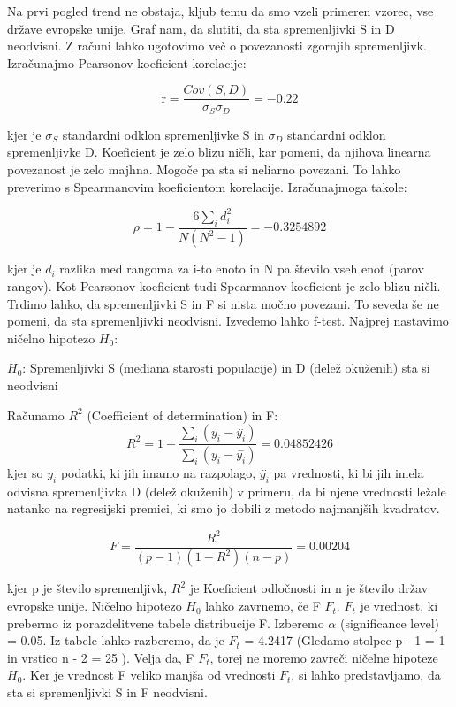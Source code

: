 \documentclass[a4paper,11pt]{article}
\begin{document}
Na prvi pogled trend ne obstaja, kljub temu da smo vzeli primeren vzorec, vse države evropske unije. Graf nam, da slutiti, da sta spremenljivki S in D neodvisni. Z računi lahko ugotovimo več o povezanosti zgornjih spremenljivk. Izračunajmo Pearsonov koeficient korelacije:

\begin{center}
\[\text{r} = \frac{Cov(S,D)}{\sigma_{S} \sigma_{D}} = -0.22\]
\end{center} 

kjer je \(\sigma_{S}\) standardni odklon spremenljivke S in \(\sigma_{D}\) standardni odklon spremenljivke D. Koeficient je zelo blizu ničli, kar pomeni, da njihova linearna povezanost je zelo majhna. Mogoče pa sta si neliarno povezani. To lahko preverimo s Spearmanovim koeficientom korelacije. Izračunajmoga takole: 

\begin{center}
\[\rho = 1 - \frac{6\sum_{i}{}d_i^2}{N(N^2 - 1)} = -0.3254892\]
\end{center} 

kjer je \( d_i \) razlika med rangoma za i-to enoto in N pa število vseh enot (parov rangov).
Kot Pearsonov koeficient tudi Spearmanov koeficient je zelo blizu ničli. Trdimo lahko, da spremenljivki S in F si nista močno povezani. To seveda še ne pomeni, da sta spremenljivki neodvisni. Izvedemo lahko f-test. Najprej nastavimo ničelno hipotezo \( H_0 \):

\begin{center}
\( H_0 \): Spremenljivki S (mediana starosti populacije) in D (delež okuženih) sta si neodvisni
\end{center}
Računamo \( R^2 \) (Coefficient of determination) in F:
\[R^2 = 1 - \frac{\sum_{i}{}(y_i - \overset{..}{y_i})}{\sum_{i}{}(y_i - \overset{-}{y_i})} = 0.04852426\]
kjer so \(y_i\) podatki, ki jih imamo na razpolago, \(\overset{..}{y_i}\) pa vrednosti, ki bi jih imela odvisna spremenljivka D (delež okuženih) v primeru, da bi njene vrednosti ležale natanko na regresijski premici, ki smo jo dobili z metodo najmanjših kvadratov.

\[F = \frac{R^2}{(p - 1)(1 - R^2)(n - p)} = 0.00204 \]

kjer p je število spremenljivk, \( R^2 \) je Koeficient odločnosti in n je število držav evropske unije. Ničelno hipotezo \( H_0 \) lahko zavrnemo, če F \ge \(F_t \). \(F_t\) je vrednost, ki prebermo iz porazdelitvene tabele distribucije F. Izberemo \(\alpha\) (significance level) = 0.05. Iz tabele lahko razberemo, da je \( F_t \) = 4.2417 (Gledamo stolpec p - 1 = 1 in vrstico n - 2 = 25 ). Velja da, F \lt \(F_t\), torej ne moremo zavreči ničelne hipoteze \(H_0\). Ker je vrednost F veliko manjša od vrednosti \(F_t\), si lahko predstavljamo, da sta si spremenljivki S in F neodvisni.
\end{document}
